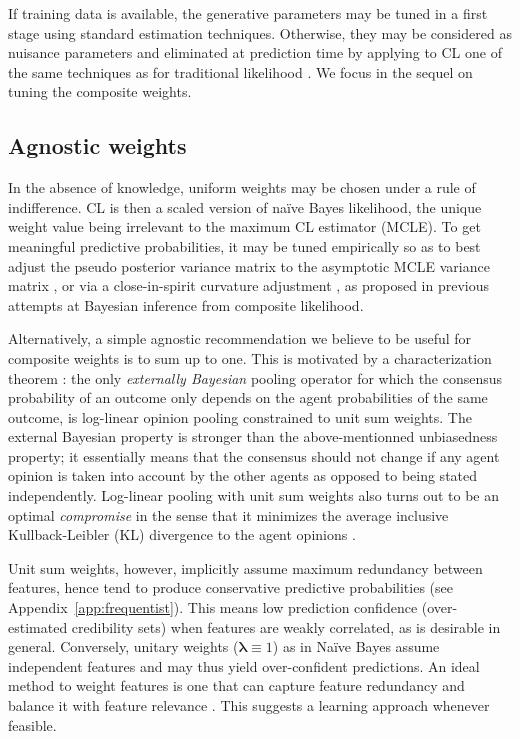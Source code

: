 \documentclass[english]{scrartcl}
\newcommand{\blambda}{{\boldsymbol{\lambda}}}
\begin{document}
If training data is available, the generative parameters may be tuned in a first stage using standard estimation techniques. Otherwise, they may be considered as nuisance parameters and eliminated at prediction time by applying to CL one of the same techniques as for traditional likelihood \cite{Berger-99}. We focus in the sequel on tuning the composite weights.


\subsection{Agnostic weights}

In the absence of knowledge, uniform weights may be chosen under a rule of indifference. CL is then a scaled version of na\"ive Bayes likelihood, the unique weight value being irrelevant to the maximum CL estimator (MCLE). To get meaningful predictive probabilities, it may be tuned empirically so as to best adjust the pseudo posterior variance matrix to the asymptotic MCLE variance matrix \cite{Pauli-11}, or via a close-in-spirit curvature adjustment \cite{Ribatet-12}, as proposed in previous attempts at Bayesian inference from composite likelihood. 

Alternatively, a simple agnostic recommendation we believe to be useful for composite weights is to sum up to one. This is motivated by a characterization theorem \cite{Genest-86,Genest-86b}: the only {\em externally Bayesian} pooling operator for which the consensus probability of an outcome only depends on the agent probabilities of the same outcome, is log-linear opinion pooling constrained to unit sum weights. The external Bayesian property is stronger than the above-mentionned unbiasedness property; it essentially means that the consensus should not change if any agent opinion is taken into account by the other agents as opposed to being stated independently. Log-linear pooling with unit sum weights also turns out to be an optimal {\em compromise} in the sense that it minimizes the average inclusive Kullback-Leibler (KL) divergence to the agent opinions \cite{Garg-04}. 

Unit sum weights, however, implicitly assume maximum redundancy between features, hence tend to produce conservative predictive probabilities (see Appendix~\ref{app:frequentist}). This means low prediction confidence (over-estimated credibility sets) when features are weakly correlated, as is desirable in general. Conversely, unitary weights ($\blambda\equiv 1$) as in Na\"ive Bayes assume independent features and may thus yield over-confident predictions. An ideal method to weight features is one that can capture feature redundancy and balance it with feature relevance \cite{Peng-05}. This suggests a learning approach whenever feasible.
\end{document}
